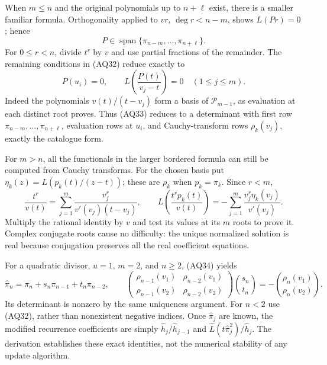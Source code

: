 \documentclass[11pt,a4paper]{article}
\theoremstyle{definition}
\begin{document}
When $m\le n$ and the original polynomials up to $n+\ell$ exist,
there is a smaller familiar formula.  Orthogonality applied to
$vr$, $\deg r<n-m$, shows $L(Pr)=0$; hence
\[
 P\in\operatorname{span}\{\pi_{n-m},\ldots,\pi_{n+\ell}\}.
\]
For $0\le r<n$, divide $t^r$ by $v$ and use partial fractions of
the remainder.  The remaining conditions in (AQ32) reduce exactly to
\begin{equation}
 P(u_i)=0,\qquad
 L\!\left(\frac{P(t)}{v_j-t}\right)=0
 \quad(1\le j\le m).
 \tag{AQ34}
\end{equation}
Indeed the polynomials $v(t)/(t-v_j)$ form a basis of
$\mathcal P_{m-1}$, as evaluation at each distinct root proves.
Thus (AQ33) reduces to a determinant with first row
$\pi_{n-m},\ldots,\pi_{n+\ell}$, evaluation rows at $u_i$,
and Cauchy-transform rows $\rho_k(v_j)$, exactly the catalogue form.

For $m>n$, all the functionals in the larger bordered formula can
still be computed from Cauchy transforms.  For the chosen basis put
$\eta_k(z)=L(p_k(t)/(z-t))$; these are $\rho_k$ when $p_k=\pi_k$.
Since $r<m$,
\begin{equation}
 \frac{t^r}{v(t)}=\sum_{j=1}^m
       \frac{v_j^r}{v'(v_j)(t-v_j)},\qquad
 L\!\left(\frac{t^rp_k(t)}{v(t)}\right)
   =-\sum_{j=1}^m\frac{v_j^r\eta_k(v_j)}{v'(v_j)}.
 \tag{AQ35}
\end{equation}
Multiply the rational identity by $v$ and test its values at its
$m$ roots to prove it.  Complex conjugate roots cause no difficulty:
the unique normalized solution is real because conjugation preserves
all the real coefficient equations.

For a quadratic divisor, $u=1$, $m=2$, and $n\ge2$, (AQ34) yields
\[
 \widehat\pi_n=\pi_n+s_n\pi_{n-1}+t_n\pi_{n-2},\qquad
 \begin{pmatrix}\rho_{n-1}(v_1)&\rho_{n-2}(v_1)\\
                 \rho_{n-1}(v_2)&\rho_{n-2}(v_2)\end{pmatrix}
 \binom{s_n}{t_n}=-\binom{\rho_n(v_1)}{\rho_n(v_2)}.
\]
Its determinant is nonzero by the same uniqueness argument.
For $n<2$ use (AQ32), rather than nonexistent negative indices.
Once $\widehat\pi_j$ are known, the modified recurrence coefficients
are simply $\widehat h_j/\widehat h_{j-1}$ and
$\widehat L(t\widehat\pi_j^2)/\widehat h_j$.
The derivation establishes these exact identities, not the numerical
stability of any update algorithm.
\end{document}
